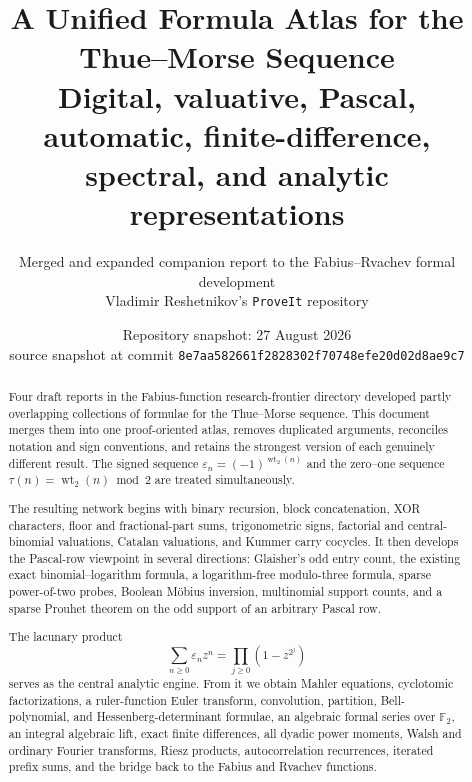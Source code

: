 \documentclass[11pt,oneside]{article}
\title{\bfseries A Unified Formula Atlas for the Thue--Morse Sequence\\[0.35em]
\large Digital, valuative, Pascal, automatic, finite-difference, spectral, and analytic representations}
\author{Merged and expanded companion report to the Fabius--Rvachev formal development\\
\small Vladimir Reshetnikov's \texttt{ProveIt} repository}
\date{Repository snapshot: 27 August 2026\\
\small source snapshot at commit \nolinkurl{8e7aa582661f2828302f70748efe20d02d8ae9c7}}
\numberwithin{equation}{section}
\theoremstyle{definition}
\theoremstyle{remark}
\newcommand{\wt}{\operatorname{wt}_2}
\newcommand{\eps}{\varepsilon}
\begin{document}
\maketitle

\begin{abstract}
Four draft reports in the Fabius-function research-frontier directory developed
partly overlapping collections of formulae for the Thue--Morse sequence.  This
document merges them into one proof-oriented atlas, removes duplicated
arguments, reconciles notation and sign conventions, and retains the strongest
version of each genuinely different result.  The signed sequence
\(\eps_n=(-1)^{\wt(n)}\) and the zero--one sequence
\(\tau(n)=\wt(n)\bmod2\) are treated simultaneously.

The resulting network begins with binary recursion, block concatenation, XOR
characters, floor and fractional-part sums, trigonometric signs, factorial and
central-binomial valuations, Catalan valuations, and Kummer carry cocycles.  It
then develops the Pascal-row viewpoint in several directions: Glaisher's odd
entry count, the existing exact binomial--logarithm formula, a logarithm-free
modulo-three formula, sparse power-of-two probes, Boolean M\"obius inversion,
multinomial support counts, and a sparse Prouhet theorem on the odd support of
an arbitrary Pascal row.

The lacunary product
\[
  \sum_{n\ge0}\eps_nz^n=\prod_{j\ge0}(1-z^{2^j})
\]
serves as the central analytic engine.  From it we obtain Mahler equations,
cyclotomic factorizations, a ruler-function Euler transform, convolution,
partition, Bell-polynomial, and Hessenberg-determinant formulae, an algebraic
formal series over \(\mathbb F_2\), an integral algebraic lift, exact finite
differences, all dyadic power moments, Walsh and ordinary Fourier transforms,
Riesz products, autocorrelation recurrences, iterated prefix sums, and the
bridge back to the Fabius and Rvachev functions.


\end{abstract}
\end{document}
